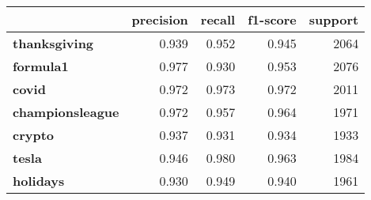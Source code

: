 \begin{tabular}{lrrrr}
\toprule
{} &  precision &  recall &  f1-score &  support \\
\midrule
\textbf{thanksgiving   } &      0.939 &   0.952 &     0.945 &     2064 \\
\textbf{formula1       } &      0.977 &   0.930 &     0.953 &     2076 \\
\textbf{covid          } &      0.972 &   0.973 &     0.972 &     2011 \\
\textbf{championsleague} &      0.972 &   0.957 &     0.964 &     1971 \\
\textbf{crypto         } &      0.937 &   0.931 &     0.934 &     1933 \\
\textbf{tesla          } &      0.946 &   0.980 &     0.963 &     1984 \\
\textbf{holidays       } &      0.930 &   0.949 &     0.940 &     1961 \\
\bottomrule
\end{tabular}
